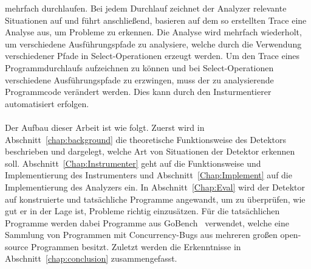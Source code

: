 mehrfach durchlaufen. Bei jedem Durchlauf zeichnet der Analyzer relevante 
Situationen auf und führt anschließend, basieren auf dem so erstellten Trace 
eine Analyse aus, um Probleme zu erkennen. Die Analyse wird mehrfach wiederholt, 
um verschiedene Ausführungspfade zu analysiere, welche durch die Verwendung 
verschiedener Pfade in Select-Operationen erzeugt werden. Um den Trace eines 
Programmdurchlaufs aufzeichnen zu können und bei Select-Operationen verschiedene 
Ausführungspfade zu erzwingen, muss der zu analysierende Programmcode 
verändert werden. Dies kann durch den Insturmentierer automatisiert erfolgen.\\\\
Der Aufbau dieser Arbeit ist wie folgt. Zuerst wird in Abschnitt~\ref{chap:background}
die theoretische Funktionsweise des Detektors beschrieben und dargelegt, 
welche Art von Situationen der Detektor erkennen soll. 
Abschnitt~\ref{Chap:Instrumenter} geht auf die Funktionsweise und Implementierung 
des Instrumenters und Abschnitt~\ref{Chap:Implement} auf die Implementierung 
des Analyzers ein. In Abschnitt~\ref{Chap:Eval} wird der Detektor auf 
konstruierte und tatsächliche Programme angewandt, um zu überprüfen, 
wie gut er in der Lage ist, Probleme richtig einzusätzen. Für die 
tatsächlichen Programme werden dabei Programme aus GoBench~\cite{gobench}
verwendet, welche eine Sammlung von Programmen mit Concurrency-Bugs aus 
mehreren großen open-source Programmen besitzt. Zuletzt werden die 
Erkenntnisse in Abschnitt~\ref{chap:conclusion} zusammengefasst. 
